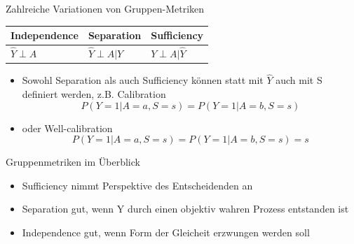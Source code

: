 \documentclass[aspectratio=169]{beamer}
\begin{document}
\begin{frame}[t]{Zahlreiche Variationen von Gruppen-Metriken}
	\begin{table}
		\begin{tabular}{lll}
			\toprule
			Independence & Separation & {Sufficiency} \\
			\midrule
			$\hat{Y} \perp A$ & $\hat{Y} \perp A | Y$ & {$Y \perp A | \hat{Y}$}\\
			\bottomrule
		\end{tabular}
	\end{table}
	\begin{itemize}
		\item<2-> Sowohl Separation als auch Sufficiency können statt mit $\hat{Y}$ auch mit S definiert werden, z.B. Calibration 	$$P(Y = 1 | A = a, S = s) = P(Y = 1 | A = b, S = s)$$
		\item<3-> oder Well-calibration $$P(Y = 1 | A = a, S = s) = P(Y = 1 | A = b, S = s) = s$$
	\end{itemize}

\end{frame}

\begin{frame}{Gruppenmetriken im Überblick}
	\begin{itemize}
		\item Sufficiency nimmt Perspektive des Entscheidenden an \cite{castelnovo2022}
		\item Separation gut, wenn Y durch einen objektiv wahren Prozess entstanden ist \cite{castelnovo2022}
		\item Independence gut, wenn Form der Gleicheit erzwungen werden soll \cite{castelnovo2022}
	\end{itemize}
	\vspace*{0.5cm}
\end{frame}
\end{document}

